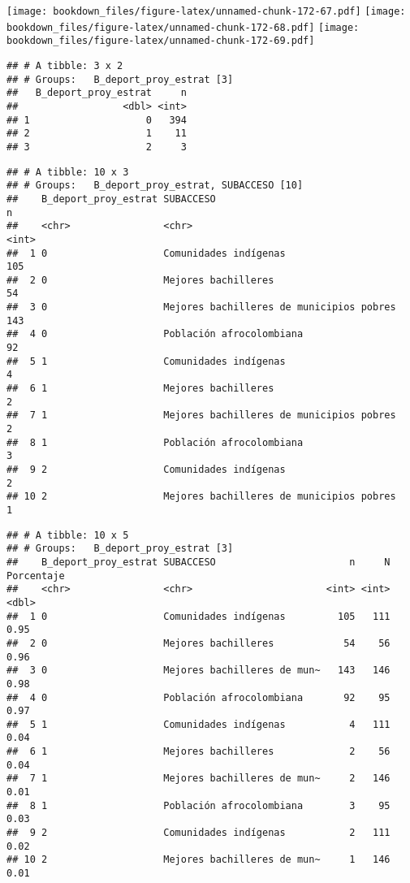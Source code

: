 \documentclass[]{article}
\theoremstyle{definition}
\theoremstyle{definition}
\theoremstyle{definition}
\theoremstyle{remark}
\begin{document}
\texttt{[image: bookdown\_files/figure-latex/unnamed-chunk-172-67.pdf]}
\texttt{[image: bookdown\_files/figure-latex/unnamed-chunk-172-68.pdf]}
\texttt{[image: bookdown\_files/figure-latex/unnamed-chunk-172-69.pdf]}

\begin{verbatim}
## # A tibble: 3 x 2
## # Groups:   B_deport_proy_estrat [3]
##   B_deport_proy_estrat     n
##                  <dbl> <int>
## 1                    0   394
## 2                    1    11
## 3                    2     3
\end{verbatim}

\begin{verbatim}
## # A tibble: 10 x 3
## # Groups:   B_deport_proy_estrat, SUBACCESO [10]
##    B_deport_proy_estrat SUBACCESO                                    n
##    <chr>                <chr>                                    <int>
##  1 0                    Comunidades indígenas                      105
##  2 0                    Mejores bachilleres                         54
##  3 0                    Mejores bachilleres de municipios pobres   143
##  4 0                    Población afrocolombiana                    92
##  5 1                    Comunidades indígenas                        4
##  6 1                    Mejores bachilleres                          2
##  7 1                    Mejores bachilleres de municipios pobres     2
##  8 1                    Población afrocolombiana                     3
##  9 2                    Comunidades indígenas                        2
## 10 2                    Mejores bachilleres de municipios pobres     1
\end{verbatim}

\begin{verbatim}
## # A tibble: 10 x 5
## # Groups:   B_deport_proy_estrat [3]
##    B_deport_proy_estrat SUBACCESO                       n     N Porcentaje
##    <chr>                <chr>                       <int> <int>      <dbl>
##  1 0                    Comunidades indígenas         105   111       0.95
##  2 0                    Mejores bachilleres            54    56       0.96
##  3 0                    Mejores bachilleres de mun~   143   146       0.98
##  4 0                    Población afrocolombiana       92    95       0.97
##  5 1                    Comunidades indígenas           4   111       0.04
##  6 1                    Mejores bachilleres             2    56       0.04
##  7 1                    Mejores bachilleres de mun~     2   146       0.01
##  8 1                    Población afrocolombiana        3    95       0.03
##  9 2                    Comunidades indígenas           2   111       0.02
## 10 2                    Mejores bachilleres de mun~     1   146       0.01
\end{verbatim}
\end{document}
